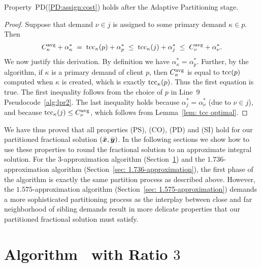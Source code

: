 \documentclass[11pt]{article}
\begin{document}

\begin{lemma}\label{lem: PD:assign:cost holds}
Property~PD(\ref{PD:assign:cost}) holds after the Adaptive Partitioning stage.
\end{lemma}

\begin{proof}
Suppose that demand $\nu\in j$ is assigned to some primary demand $\kappa\in p$.
Then
%
\begin{eqnarray*}
 C^{{\mbox{\scriptsize\rm avg}}}_{\kappa} + \alpha_{\kappa}^\ast \;=\; \textrm{tcc}_\kappa(p) + \alpha^\ast_p
 					\;\le\; \textrm{tcc}_\kappa(j) + \alpha^\ast_j   
					\;\le\; C^{{\mbox{\scriptsize\rm avg}}}_{\nu} + \alpha^\ast_\nu.
\end{eqnarray*}
%
We now justify this derivation. By definition we have
$\alpha_{\kappa}^\ast = \alpha^\ast_p$.  Further, by the
algorithm, if $\kappa$ is a primary demand of client $p$,
then $C^{{\mbox{\scriptsize\rm avg}}}_{\kappa}$ is equal to $\textrm{tcc}(p)$ computed when
$\kappa$ is created, which is exactly $\textrm{tcc}_\kappa(p)$. Thus
the first equation is true. The first inequality follows
from the choice of $p$ in Line~9
Pseudocode~\ref{alg:lpr2}. The last inequality holds
because $\alpha^\ast_j = \alpha^\ast_\nu$ (due to $\nu\in
j$), and because $\textrm{tcc}_\kappa(j) \le C^{{\mbox{\scriptsize\rm avg}}}_{\nu}$, which
follows from Lemma~\ref{lem: tcc optimal}.
\end{proof}

We have thus proved that all properties (PS), (CO), (PD) and (SI) hold
for our partitioned fractional solution $(\bar{\boldsymbol{x}},\bar{\boldsymbol{y}})$. In the
following sections we show how to use these properties to round the
fractional solution to an approximate integral solution. For the
$3$-approximation algorithm (Section~\ref{sec: 3-approximation}) and
the $1.736$-approximation algorithm (Section~\ref{sec:
  1.736-approximation}), the first phase of the algorithm is exactly
the same partition process as described above. However, the
$1.575$-approximation algorithm (Section~\ref{sec:
  1.575-approximation}) demands a more sophisticated partitioning
process as the interplay between close and far neighborhood of sibling
demands result in more delicate properties that our partitioned
fractional solution must satisfy.


\section{Algorithm~{\EGUP} with Ratio $3$}
\label{sec: 3-approximation}
\end{document}
